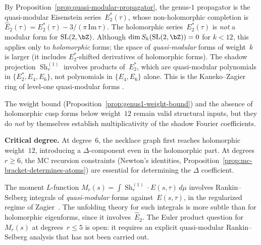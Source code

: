 \begin{remark}%
\label{rem:quasimodular-obstruction}%
%
%
By Proposition~\ref{prop:quasi-modular-propagator}, the genus-$1$
propagator is the quasi-modular Eisenstein series~$E_2^*(\tau)$,
whose non-holomorphic completion is
$\widehat{E}_2(\tau) = E_2^*(\tau) - 3/(\pi\,\mathrm{Im}\,\tau)$.
The holomorphic series~$E_2^*(\tau)$ is \emph{not} a modular form for
$\mathrm{SL}(2,\bZ)$.
Although $\dim S_k(\mathrm{SL}(2,\bZ)) = 0$ for $k < 12$,
this applies only to \emph{holomorphic} forms; the space of
\emph{quasi-modular} forms of weight~$k$ is larger
(it includes $E_2^*$-shifted derivatives of holomorphic forms).
The shadow projection $\operatorname{Sh}_r^{(1)}$ involves
products of~$E_2^*$, which are quasi-modular polynomials in
$\{E_2^*, E_4, E_6\}$, not polynomials in $\{E_4, E_6\}$ alone.
This is the Kaneko--Zagier ring of level-one quasi-modular forms
\cite{KanekoZagier1995}.

The weight bound (Proposition~\ref{prop:genus1-weight-bound})
and the absence of holomorphic cusp forms below weight~$12$
remain valid structural inputs, but they do \emph{not} by
themselves establish multiplicativity of the shadow Fourier
coefficients.

\textbf{Critical degree.}
At degree~$6$, the necklace graph first reaches holomorphic
weight~$12$, introducing a $\Delta$-component even in the
holomorphic part.
At degrees~$r \ge 6$, the MC recursion constraints
(Newton's identities,
Proposition~\ref{prop:mc-bracket-determines-atoms}) are
essential for determining the $\Delta$ coefficient.
\end{remark}

\begin{remark}%
\label{rem:quasimodular-rankin-selberg-open}%
%
The moment $L$-function
$M_r(s) = \int \operatorname{Sh}_r^{(1)} \cdot E(s,\tau)\,d\mu$
involves Rankin--Selberg integrals of \emph{quasi-modular}
forms against~$E(s,\tau)$, in the regularized regime of
Zagier~\cite{Zagier1981RankinSelberg}.
The unfolding theory for such integrals is more subtle than for
holomorphic eigenforms, since it involves~$\widehat{E}_2$.
The Euler product question for~$M_r(s)$ at degrees~$r \le 5$
is open: it requires an explicit quasi-modular Rankin--Selberg
analysis that has not been carried out.
\end{remark}

